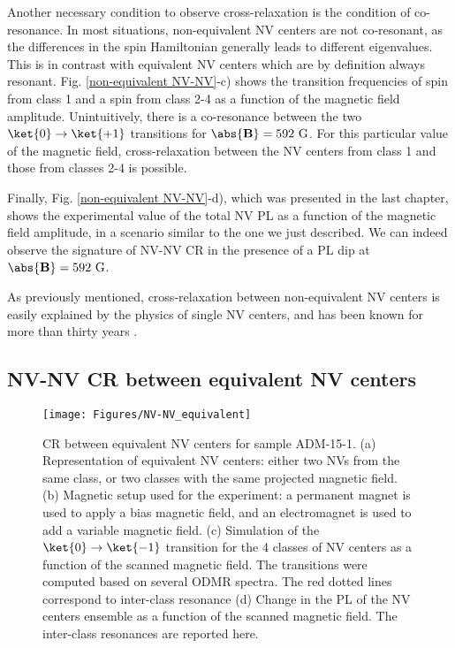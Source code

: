 \documentclass[a4paper,11pt]{report}
\begin{document}
Another necessary condition to observe cross-relaxation is the condition of co-resonance. In most situations, non-equivalent NV centers are not co-resonant, as the differences in the spin Hamiltonian generally leads to different eigenvalues. This is in contrast with equivalent NV centers which are by definition always resonant. Fig. \ref{non-equivalent NV-NV}-c) shows the transition frequencies of spin from class 1 and a spin from class 2-4 as a function of the magnetic field amplitude. Unintuitively, there is a co-resonance between the two $\ket{0} \to \ket{+1}$ transitions for $\abs{\mathbf{B}}=592\ \rm G$. For this particular value of the magnetic field, cross-relaxation between the NV centers from class 1 and those from classes 2-4 is possible.

Finally, Fig. \ref{non-equivalent NV-NV}-d), which was presented in the last chapter, shows the experimental value of the total NV PL as a function of the magnetic field amplitude, in a scenario similar to the one we just described. We can indeed observe the signature of NV-NV CR in the presence of a PL dip at $\abs{\mathbf{B}}=592\ \rm G$.

As previously mentioned, cross-relaxation between non-equivalent NV centers is easily explained by the physics of single NV centers, and has been known for more than thirty years \citep{holliday1989optical, van1989cross}.

\subsection{NV-NV CR between equivalent NV centers}

\begin{figure}[h]
\centering
\texttt{[image: Figures/NV-NV\_equivalent]}
\caption{CR between equivalent NV centers for sample ADM-15-1. (a) Representation of equivalent NV centers: either two NVs from the same class, or two classes with the same projected magnetic field. (b) Magnetic setup used for the experiment: a permanent magnet is used to apply a bias magnetic field, and an electromagnet is used to add a variable magnetic field. (c) Simulation of the $\ket{0}\to\ket{-1}$ transition for the 4 classes of NV centers as a function of the scanned magnetic field. The transitions were computed based on several ODMR spectra. The red dotted lines correspond to inter-class resonance (d) Change in the PL of the NV centers ensemble as a function of the scanned magnetic field. The inter-class resonances are reported here.}
\label{equivalent NV-NV}
\end{figure}
\end{document}
